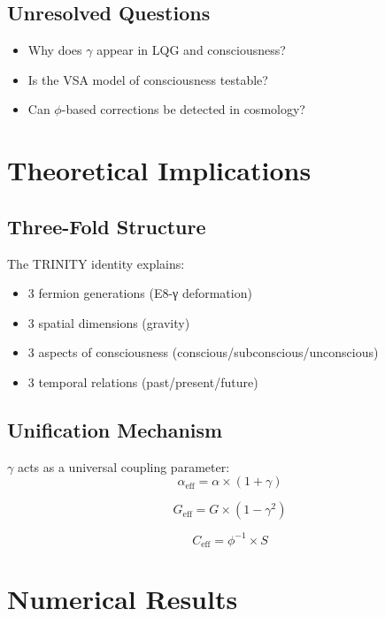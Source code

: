 \documentclass[12pt,a4paper]{article}
\begin{document}
\subsection{Unresolved Questions}

\begin{itemize}
\item Why does $\gamma$ appear in LQG and consciousness?
\item Is the VSA model of consciousness testable?
\item Can $\phi$-based corrections be detected in cosmology?
\end{itemize}

\section{Theoretical Implications}

\subsection{Three-Fold Structure}

The TRINITY identity explains:
\begin{itemize}
\item 3 fermion generations (E8-γ deformation)
\item 3 spatial dimensions (gravity)
\item 3 aspects of consciousness (conscious/subconscious/unconscious)
\item 3 temporal relations (past/present/future)
\end{itemize}

\subsection{Unification Mechanism}

$\gamma$ acts as a universal coupling parameter:
\begin{equation}
\alpha_{\text{eff}} = \alpha \times (1 + \gamma)
\end{equation}

\begin{equation}
G_{\text{eff}} = G \times (1 - \gamma^2)
\end{equation}

\begin{equation}
C_{\text{eff}} = \phi^{-1} \times S
\end{equation}

\section{Numerical Results}
\end{document}
